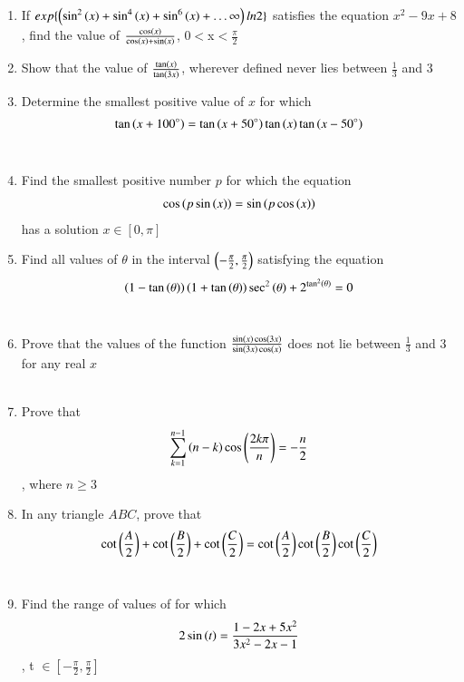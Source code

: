 \documentclass[journal,12pt,article,twocolumn]{IEEEtran}
\theoremstyle{remark}
\begin{document}
\begin{enumerate}
\item If $exp \{\left(\sin^2\left(x\right)+\sin^4\left(x\right)+\sin^6\left(x\right)+\dots\infty\right)ln2\}$ satisfies the equation $x^2-9x+8$, find the value of $\frac{\cos \left(x\right)}{\cos \left(x\right) + \sin \left(x\right)}$, 0$<$x$<$$\frac{\pi}{2}$
\hfill{}\\
\item Show that the value of  $\frac{\tan \left(x\right)}{\tan \left(3x\right)}$, wherever defined never lies between $\frac{1}{3}$ and 3
\hfill{}\\
\item Determine the smallest positive value of $x$  for which 
\begin{align*}
\tan {\ensuremath{\left(x+100^{\circ}\right)}}=\tan {\ensuremath{\left(x+50^{\circ}\right)}}\tan \left(x\right)\tan {\ensuremath{\left(x-50^{\circ}\right)}}
\end{align*}
\hfill{}\\
\item Find the smallest positive number $p$ for which the equation 
\begin{align*}
\cos {\ensuremath{\left(p\sin \left(x\right)\right)}}=\sin {\ensuremath{\left(p\cos \left(x\right)\right)}}
\end{align*}
has a solution $ x \in [0, \pi]$
\hfill{}\\
\item Find all values of $\theta$ in the interval $\left(-\frac{\pi}{2},\frac{\pi}{2}\right)$ satisfying the equation 
\begin{align*}
\left(1-\tan \left(\theta\right)\right)\left(1+\tan \left(\theta\right)\right)\sec^2\left(\theta\right)+ 2^{\tan^2\left(\theta\right)}=0
\end{align*}
\hfill{}\\
\item Prove that the values of the function $\frac{\sin \left(x\right) \cos \left(3x\right)}{\sin \left(3x\right) \cos \left(x\right)}$ does not lie between $\frac{1}{3}$ and 3 for any real $x$\\
\hfill{}\\
\item Prove that 
\begin{align*}
\sum_{k=1}^{n-1} \left(n-k\right)\cos\left( \frac{2k\pi}{n}\right)=-\frac{n}{2}
\end{align*}
, where $n\ge3$
\hfill{}\\
\item In any triangle $ABC$, prove that 
\begin{align*}
\cot \left(\frac{A}{2}\right)+\cot \left(\frac{B}{2}\right)+\cot \left(\frac{C}{2}\right)=\cot \left(\frac{A}{2}\right)\cot \left(\frac{B}{2}\right)\cot \left(\frac{C}{2}\right)
\end{align*}
\hfill{}\\
\item Find the range of values of for which 
\begin{align*}
2\sin \left(t\right) = \frac{1-2x+5x^2}{3x^2-2x-1}
\end{align*}
, t $\in \left[-\frac{\pi}{2},\frac{\pi}{2}\right]$
\hfill{}\\
\end{enumerate}
\end{document}
